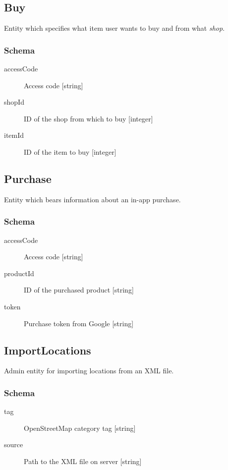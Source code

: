 	\subsection{Buy}
		\label{json:buy}
		Entity which specifies what item user wants to buy and from what \textit{shop}.

		\subsubsection{Schema}
			\begin{description}
				\item[accessCode] Access code [string]
				\item[shopId] ID of the shop from which to buy [integer]
				\item[itemId] ID of the item to buy [integer]
			\end{description}
	
	\subsection{Purchase}
		\label{json:purchase}
		Entity which bears information about an in-app purchase.
		\subsubsection{Schema}
			\begin{description}
				\item[accessCode] Access code [string]
				\item[productId] ID of the purchased product [string]
				\item[token] Purchase token from Google [string]
			\end{description}
		
	\subsection{ImportLocations}
		\label{json:importlocations}
		Admin entity for importing locations from an XML file.
		\subsubsection{Schema}
			\begin{description}
				\item[tag] OpenStreetMap category tag [string]
				\item[source] Path to the XML file on server [string]
			\end{description}
		
